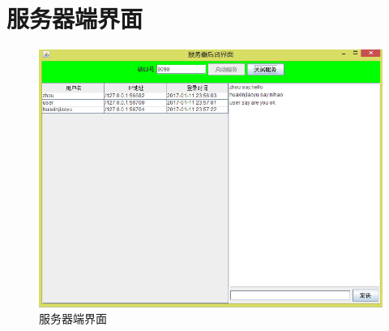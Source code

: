     \section{服务器端界面}
    \begin{figure}[h]
        \centering
        \includegraphics[scale=0.7]{OutlineDesign/figures/服务器端界面.png}
        \caption{服务器端界面}
        \label{fig:server_flow}
    \end{figure}
    \newpage
